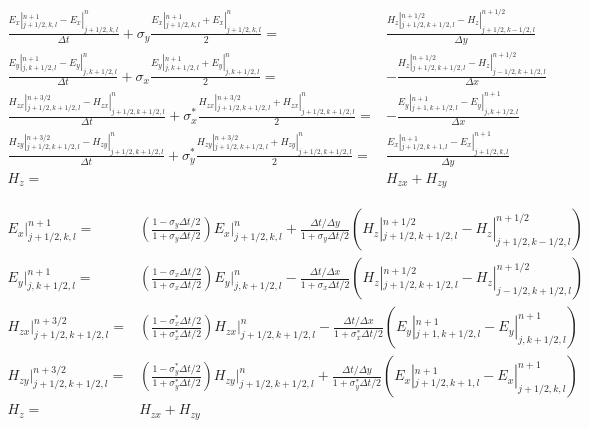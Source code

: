 %
\begin{subequations}
\begin{align}
\frac{E_x|^{n+1}_{j+1/2,k,l}-E_x|^{n}_{j+1/2,k,l}}{\Delta t} + \sigma_y \frac{E_x|^{n+1}_{j+1/2,k,l}+E_x|^{n}_{j+1/2,k,l}}{2} = & \frac{H_z|^{n+1/2}_{j+1/2,k+1/2,l}-H_z|^{n+1/2}_{j+1/2,k-1/2,l}}{\Delta y} \\
%
\frac{E_y|^{n+1}_{j,k+1/2,l}-E_y|^{n}_{j,k+1/2,l}}{\Delta t} + \sigma_x \frac{E_y|^{n+1}_{j,k+1/2,l}+E_y|^{n}_{j,k+1/2,l}}{2} = & - \frac{H_z|^{n+1/2}_{j+1/2,k+1/2,l}-H_z|^{n+1/2}_{j-1/2,k+1/2,l}}{\Delta x} \\
%
\frac{H_{zx}|^{n+3/2}_{j+1/2,k+1/2,l}-H_{zx}|^{n}_{j+1/2,k+1/2,l}}{\Delta t} + \sigma^*_x \frac{H_{zx}|^{n+3/2}_{j+1/2,k+1/2,l}+H_{zx}|^{n}_{j+1/2,k+1/2,l}}{2} = & - \frac{E_y|^{n+1}_{j+1,k+1/2,l}-E_y|^{n+1}_{j,k+1/2,l}}{\Delta x} \\
%
\frac{H_{zy}|^{n+3/2}_{j+1/2,k+1/2,l}-H_{zy}|^{n}_{j+1/2,k+1/2,l}}{\Delta t} + \sigma^*_y \frac{H_{zy}|^{n+3/2}_{j+1/2,k+1/2,l}+H_{zy}|^{n}_{j+1/2,k+1/2,l}}{2} = & \frac{E_x|^{n+1}_{j+1/2,k+1,l}-E_x|^{n+1}_{j+1/2,k,l}}{\Delta y} \\
%
H_z = & H_{zx}+H_{zy}
\end{align}
\end{subequations}

%
\begin{subequations}
\begin{align}
E_x|^{n+1}_{j+1/2,k,l} = & \left(\frac{1-\sigma_y \Delta t/2}{1+\sigma_y \Delta t/2}\right) E_x|^{n}_{j+1/2,k,l} + \frac{\Delta t/\Delta y}{1+\sigma_y \Delta t/2} \left(H_z|^{n+1/2}_{j+1/2,k+1/2,l}-H_z|^{n+1/2}_{j+1/2,k-1/2,l}\right) \\
%
E_y|^{n+1}_{j,k+1/2,l} = & \left(\frac{1-\sigma_x \Delta t/2}{1+\sigma_x \Delta t/2}\right) E_y|^{n}_{j,k+1/2,l} - \frac{\Delta t/\Delta x}{1+\sigma_x \Delta t/2} \left(H_z|^{n+1/2}_{j+1/2,k+1/2,l}-H_z|^{n+1/2}_{j-1/2,k+1/2,l}\right) \\
%
H_{zx}|^{n+3/2}_{j+1/2,k+1/2,l} = & \left(\frac{1-\sigma^*_x \Delta t/2}{1+\sigma^*_x \Delta t/2}\right) H_{zx}|^{n}_{j+1/2,k+1/2,l} - \frac{\Delta t/\Delta x}{1+\sigma^*_x \Delta t/2} \left(E_y|^{n+1}_{j+1,k+1/2,l}-E_y|^{n+1}_{j,k+1/2,l}\right) \\
%
H_{zy}|^{n+3/2}_{j+1/2,k+1/2,l} = & \left(\frac{1-\sigma^*_y \Delta t/2}{1+\sigma^*_y \Delta t/2}\right) H_{zy}|^{n}_{j+1/2,k+1/2,l} + \frac{\Delta t/\Delta y}{1+\sigma^*_y \Delta t/2} \left(E_x|^{n+1}_{j+1/2,k+1,l}-E_x|^{n+1}_{j+1/2,k,l}\right) \\
%
H_z = & H_{zx}+H_{zy}
\end{align}
\end{subequations}

